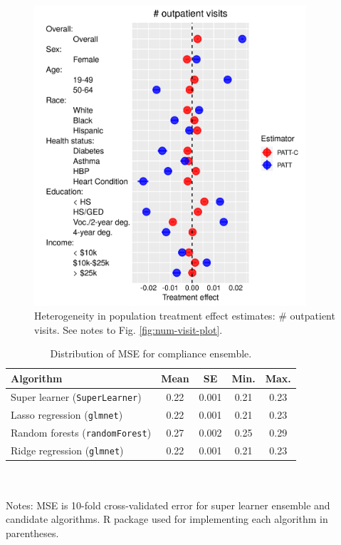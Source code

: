 \documentclass[hidelinks,12pt]{article}
\begin{document}
\begin{appendices}
\begin{figure}[htbp]
	\begin{center}
		\includegraphics[width = 0.9\textwidth]{num-out-plot.png}
		\caption{Heterogeneity in population treatment effect estimates: $\#$ outpatient visits. See notes to Fig. \ref{fig:num-visit-plot}.\label{fig:num-out-plot}}
	\end{center}
\end{figure}

\begin{table}[h]
\caption{Distribution of MSE for compliance ensemble.\label{compliance-ensemble}} 
\begin{tabular}{lcccc}
  \hline
 Algorithm & Mean & SE & Min. & Max. \\ 
  \hline
Super learner (\texttt{SuperLearner}) & 0.22  & 0.001 & 0.21 & 0.23 \\
\hline
Lasso regression (\texttt{glmnet})  & 0.22  & 0.001 & 0.21 & 0.23 \\
Random forests (\texttt{randomForest}) & 0.27  & 0.002 & 0.25 & 0.29 \\
Ridge regression (\texttt{glmnet}) & 0.22  & 0.001 & 0.21 & 0.23 \\
   \hline
\end{tabular} \\ \\
\footnotesize{Notes: MSE is 10-fold cross-validated error for super learner ensemble and candidate algorithms. \textsf{R} package used for implementing each algorithm in parentheses.}
\end{table}


\end{appendices}
\end{document}
